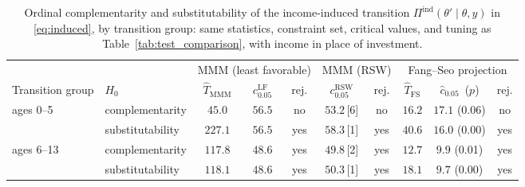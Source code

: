 \begin{table}[htbp]
\centering\small
\begin{tabular}{@{}llcccccccc@{}}
\toprule
 & & \multicolumn{3}{c}{MMM (least favorable)} & \multicolumn{2}{c}{MMM (RSW)} & \multicolumn{3}{c}{Fang--Seo projection} \\
\cmidrule(lr){3-5}\cmidrule(lr){6-7}\cmidrule(lr){8-10}
Transition group & $H_0$ & $\hat T_{\mathrm{MMM}}$ & $c^{\mathrm{LF}}_{0.05}$ & rej. & $c^{\mathrm{RSW}}_{0.05}$ & rej. & $\hat T_{\mathrm{FS}}$ & $\hat c_{0.05}$ \,($p$) & rej. \\ \midrule
ages 0--5 & complementarity & $45.0$ & $56.5$ & no & $53.2$\,[6] & no & $16.2$ & $17.1$ (0.06) & no \\
 & substitutability & $227.1$ & $56.5$ & yes & $58.3$\,[1] & yes & $40.6$ & $16.0$ (0.00) & yes \\
\midrule
ages 6--13 & complementarity & $117.8$ & $48.6$ & yes & $49.8$\,[2] & yes & $12.7$ & $9.9$ (0.01) & yes \\
 & substitutability & $118.1$ & $48.6$ & yes & $50.3$\,[1] & yes & $18.1$ & $9.7$ (0.00) & yes \\
\bottomrule
\end{tabular}
\caption{Ordinal complementarity and substitutability of the income-induced transition $\Pi^{\mathrm{ind}}(\theta'\mid\theta,y)$ in \eqref{eq:induced}, by transition group: same statistics, constraint set, critical values, and tuning as Table~\ref{tab:test_comparison}, with income in place of investment.}
\label{tab:test_comparison_induced}
\end{table}
